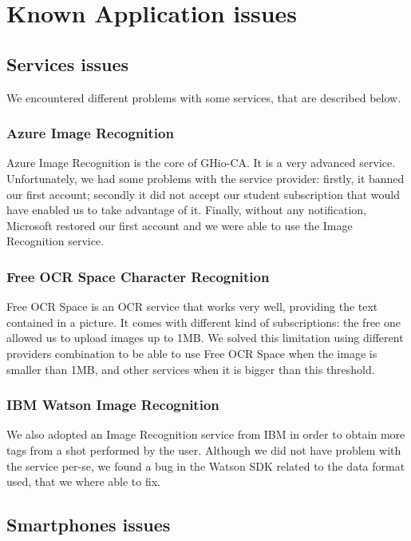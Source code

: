 \section{Known Application issues}
\label{sec:issues}

\subsection{Services issues}

We encountered different problems with some services, that are described below.

\subsubsection{Azure Image Recognition}

Azure Image Recognition is the core of GHio-CA. It is a very advanced service. 
Unfortunately, we had some problems with the service provider: firstly, it 
banned our first account; secondly it did not accept our student subscription 
that would have enabled us to take advantage of it. Finally, without any 
notification, Microsoft restored our first account and we were able to use the 
Image Recognition service.

\subsubsection{Free OCR Space Character Recognition}

Free OCR Space is an OCR service that works very well, providing the text 
contained in a picture. It comes with different kind of subscriptions: the free 
one allowed us to upload images up to 1MB. We solved this limitation using 
different providers combination to be able to use Free OCR Space when the image 
is smaller than 1MB, and other services when it is bigger than this threshold.

\subsubsection{IBM Watson Image Recognition}

We also adopted an Image Recognition service from IBM in order to obtain more 
tags from a shot performed by the user. Although we did not have problem with 
the service per-se, we found a bug in the Watson SDK related to the data format 
used, that we where able to fix.

\subsection{Smartphones issues}

